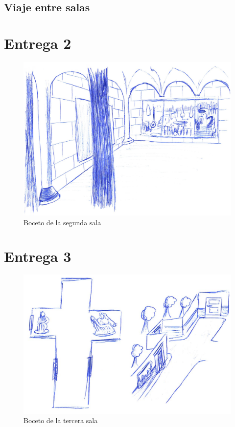 \subsection{Viaje entre salas}


\section{Entrega 2}

\begin{figure}[!h]
\begin{center}
\includegraphics[width=1\textwidth]{imagenes/7/bocetos/boceto-sala-2.png}
\caption{Boceto de la segunda sala}
\label{fig:bocetos-salas-2}
\end{center}
\end{figure}

\section{Entrega 3}

\begin{figure}[!h]
\begin{center}
\includegraphics[width=1\textwidth]{imagenes/7/bocetos/boceto-sala-3.png}
\caption{Boceto de la tercera sala}
\label{fig:bocetos-salas-3}
\end{center}
\end{figure}

